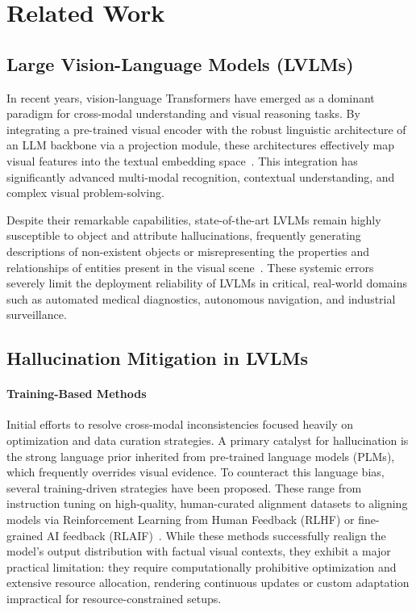 \section{Related Work}
\label{sec:related_work}

\subsection{Large Vision-Language Models (LVLMs)}
In recent years, vision-language Transformers have emerged as a dominant paradigm for cross-modal understanding and visual reasoning tasks. By integrating a pre-trained visual encoder with the robust linguistic architecture of an LLM backbone via a projection module, these architectures effectively map visual features into the textual embedding space~\cite{alayrac2022flamingo,li2023blip2,liu2024visual}. This integration has significantly advanced multi-modal recognition, contextual understanding, and complex visual problem-solving. 

Despite their remarkable capabilities, state-of-the-art LVLMs remain highly susceptible to object and attribute hallucinations, frequently generating descriptions of non-existent objects or misrepresenting the properties and relationships of entities present in the visual scene~\cite{rohrbach2018object,li2023pope}. These systemic errors severely limit the deployment reliability of LVLMs in critical, real-world domains such as automated medical diagnostics, autonomous navigation, and industrial surveillance.

\subsection{Hallucination Mitigation in LVLMs}

\paragraph{Training-Based Methods} 
Initial efforts to resolve cross-modal inconsistencies focused heavily on optimization and data curation strategies. A primary catalyst for hallucination is the strong language prior inherited from pre-trained language models (PLMs), which frequently overrides visual evidence. To counteract this language bias, several training-driven strategies have been proposed. These range from instruction tuning on high-quality, human-curated alignment datasets to aligning models via Reinforcement Learning from Human Feedback (RLHF) or fine-grained AI feedback (RLAIF)~\cite{sun2023aligning,jing2024fgaif}. While these methods successfully realign the model's output distribution with factual visual contexts, they exhibit a major practical limitation: they require computationally prohibitive optimization and extensive resource allocation, rendering continuous updates or custom adaptation impractical for resource-constrained setups.

